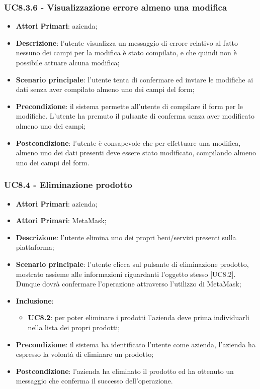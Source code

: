 \subsubsection{UC8.3.6 - Visualizzazione errore almeno una modifica}
\begin{itemize}
	\item \textbf{Attori Primari}: azienda;
	\item \textbf{Descrizione}:
	l'utente visualizza un messaggio di errore relativo al fatto nessuno dei campi per la modifica è stato compilato, e che quindi non è possibile attuare alcuna modifica;
	\item \textbf{Scenario principale}: l'utente tenta di confermare ed inviare le modifiche ai dati senza aver compilato almeno uno dei campi del form;
	\item \textbf{Precondizione}: il sistema permette all'utente di compilare il form per le modifiche. L'utente ha premuto il pulsante di conferma senza aver modificato almeno uno dei campi; 
	\item \textbf{Postcondizione}:
	l'utente è consapevole che per effettuare una modifica, almeno uno dei dati presenti deve essere stato modificato, compilando almeno uno dei campi del form.
\end{itemize}

\subsubsection{UC8.4 - Eliminazione prodotto}
\begin{itemize}
	\item \textbf{Attori Primari}: azienda;
	\item \textbf{Attori Primari}: MetaMask\glo;
	\item \textbf{Descrizione}:
	l'utente elimina uno dei propri beni/servizi presenti sulla piattaforma;
	\item \textbf{Scenario principale}: l'utente clicca sul pulsante di eliminazione prodotto, mostrato assieme alle informazioni riguardanti l'oggetto stesso [UC8.2]. Dunque dovrà confermare l'operazione attraverso l'utilizzo di MetaMask\glo;
	\item \textbf{Inclusione}:
	\begin{itemize}
		\item \textbf{UC8.2}: per poter eliminare i prodotti l'azienda deve prima individuarli nella lista dei propri prodotti;
	\end{itemize}
	\item \textbf{Precondizione}: il sistema ha identificato l'utente come azienda, l'azienda ha espresso la volontà di eliminare un prodotto;
	\item \textbf{Postcondizione}: l'azienda ha eliminato il prodotto ed ha ottenuto un messaggio che conferma il successo dell'operazione.
\end{itemize}


